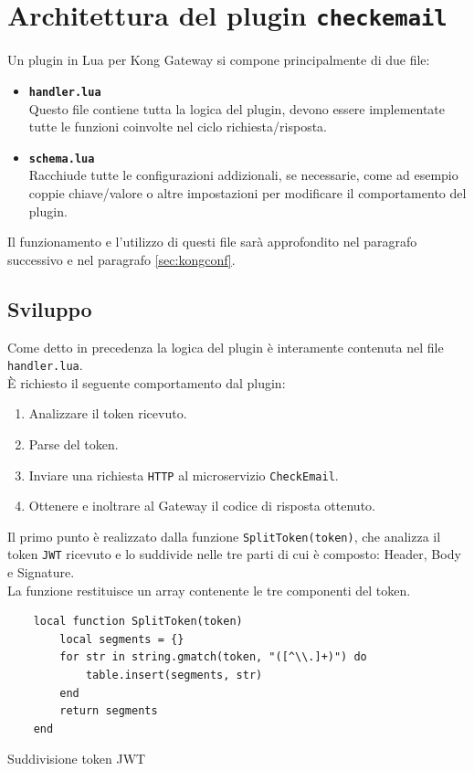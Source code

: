 \section{Architettura del plugin \texttt{checkemail}}\label{sec:architetturaplugin}
Un plugin in Lua per Kong Gateway si compone principalmente di due file:

\begin{itemize}
	\item \textbf{\texttt{handler.lua}}\\ Questo file contiene tutta la logica del plugin, devono essere implementate tutte le funzioni coinvolte nel ciclo richiesta/risposta.
	\item \textbf{\texttt{schema.lua}}\\ Racchiude tutte le configurazioni addizionali, se necessarie, come ad esempio coppie chiave/valore o altre impostazioni per modificare il comportamento del plugin.
\end{itemize}

Il funzionamento e l'utilizzo di questi file sarà approfondito nel paragrafo successivo e nel paragrafo \ref{sec:kongconf}.

\subsection{Sviluppo}\label{sec:sviluppoplugin}
Come detto in precedenza la logica del plugin è interamente contenuta nel file \texttt{handler.lua}.\\ 
È richiesto il seguente comportamento dal plugin:

\begin{enumerate}
	\item Analizzare il token ricevuto.
	\item Parse del token.
	\item Inviare una richiesta \texttt{HTTP} al microservizio \texttt{CheckEmail}.
	\item Ottenere e inoltrare al Gateway il codice di risposta ottenuto.
\end{enumerate}

Il primo punto è realizzato dalla funzione \texttt{SplitToken(token)}, che analizza il token \texttt{JWT} ricevuto e lo suddivide nelle tre parti di cui è composto: Header, Body e Signature.\\
La funzione restituisce un array contenente le tre componenti del token.

\begin{algorithm}
\centering
\begin{verbatim}
	local function SplitToken(token)
		local segments = {}
		for str in string.gmatch(token, "([^\\.]+)") do
			table.insert(segments, str)
		end
		return segments
	end
\end{verbatim}
\caption{Suddivisione token JWT}\label{alg:splittoken}
\end{algorithm}

